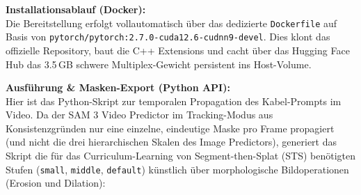 \documentclass[12pt,a4paper]{article}
\begin{document}
\textbf{Installationsablauf (Docker):}\\
Die Bereitstellung erfolgt vollautomatisch über das dedizierte \texttt{Dockerfile} auf Basis von \texttt{pytorch/pytorch:2.7.0-cuda12.6-cudnn9-devel}. Dies klont das offizielle Repository, baut die C++ Extensions und cacht über das Hugging Face Hub das 3.5\,GB schwere Multiplex-Gewicht persistent ins Host-Volume.

\textbf{Ausführung \& Masken-Export (Python API):}\\
Hier ist das Python-Skript zur temporalen Propagation des Kabel-Prompts im Video. Da der SAM 3 Video Predictor im Tracking-Modus aus Konsistenzgründen nur eine einzelne, eindeutige Maske pro Frame propagiert (und nicht die drei hierarchischen Skalen des Image Predictors), generiert das Skript die für das Curriculum-Learning von Segment-then-Splat (STS) benötigten Stufen (\texttt{small}, \texttt{middle}, \texttt{default}) künstlich über morphologische Bildoperationen (Erosion und Dilation):
\end{document}

